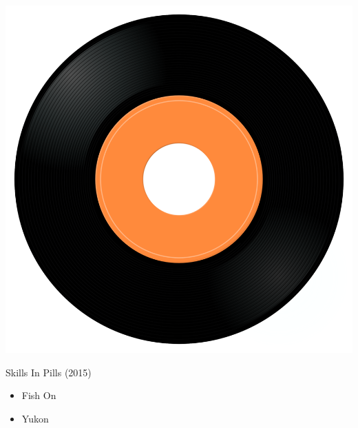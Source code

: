 \begin{minipage}[t]{0.25\textwidth}
\captionsetup{type=figure}
\includegraphics[width=\textwidth]{Images/cover.png}
\caption*{Skills In Pills (2015)}
\end{minipage}
\begin{minipage}[t]{0.25\textwidth}\vspace{0pt}
\begin{itemize}[nosep,leftmargin=1em,labelwidth=*,align=left]
	\setlength{\itemsep}{0pt}
	\item Fish On
	\item Yukon
\end{itemize}
\end{minipage}
